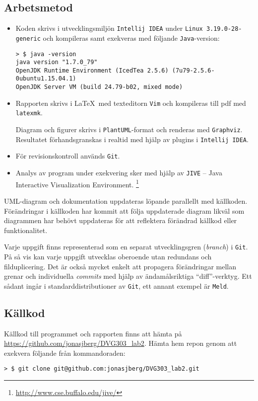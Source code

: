 \subsection*{Arbetsmetod}
\begin{itemize}
    \item Koden skrivs i utvecklingsmiljön \texttt{Intellij IDEA} under
          \texttt{Linux 3.19.0-28-generic} och kompileras samt exekveras med 
          följande \texttt{Java}-version:
\begin{verbatim}
> $ java -version
java version "1.7.0_79"
OpenJDK Runtime Environment (IcedTea 2.5.6) (7u79-2.5.6-0ubuntu1.15.04.1)
OpenJDK Server VM (build 24.79-b02, mixed mode)
\end{verbatim}

    \item Rapporten skrivs i \LaTeX\ med texteditorn \texttt{Vim} och kompileras
          till pdf med \texttt{latexmk}.  \par Diagram och figurer skrivs i
          \texttt{PlantUML}-format och renderas med \texttt{Graphviz}. 
          Resultatet förhandsgranskas i realtid med hjälp av plugins i 
          \texttt{Intellij IDEA}.

    \item För revisionskontroll används \texttt{Git}.

    \item Analys av program under exekvering sker med hjälp av 
          \texttt{JIVE} -- Java Interactive Visualization Environment.
          \footnote{\url{http://www.cse.buffalo.edu/jive/}}

\end{itemize}

UML-diagram och dokumentation uppdateras löpande parallellt med källkoden.
Förändringar i källkoden har kommit att följa uppdaterade diagram likväl som
diagrammen har behövt uppdateras för att reflektera förändrad källkod eller
funktionalitet.
\par Varje uppgift finns representerad som en separat utvecklingsgren
(\emph{branch}) i \texttt{Git}. På så vis kan varje uppgift utvecklas oberoende
utan redundans och filduplicering. Det är också mycket enkelt att propagera
förändringar mellan grenar och individuella \emph{commits} med hjälp av
ändamålsriktiga ``diff''-verktyg. Ett sådant ingår i standarddistributioner av
\texttt{Git}, ett annant exempel är \texttt{Meld}.


\subsection*{Källkod}
\par Källkod till programmet och rapporten finns att hämta på
\url{https://github.com/jonasjberg/DVG303_lab2}.
Hämta hem repon genom att exekvera följande från kommandoraden:
\begin{verbatim}
> $ git clone git@github.com:jonasjberg/DVG303_lab2.git
\end{verbatim}

